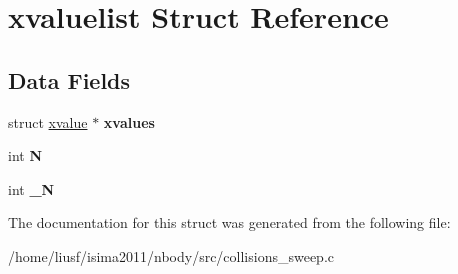 \hypertarget{structxvaluelist}{
\section{xvaluelist Struct Reference}
\label{structxvaluelist}
}
\subsection*{Data Fields}
\begin{DoxyCompactItemize}
\item 
\hypertarget{structxvaluelist_aaeea98f4613b083a3095c46469e808d8}{
struct \hyperlink{structxvalue}{xvalue} $\ast$ {\bfseries xvalues}}
\label{structxvaluelist_aaeea98f4613b083a3095c46469e808d8}

\item 
\hypertarget{structxvaluelist_a55f65c1952ca64b175c3c1287ea8ae4c}{
int {\bfseries N}}
\label{structxvaluelist_a55f65c1952ca64b175c3c1287ea8ae4c}

\item 
\hypertarget{structxvaluelist_a98a4bbe8f114eae2e3a9c7dfcb5a7efc}{
int {\bfseries \_\-N}}
\label{structxvaluelist_a98a4bbe8f114eae2e3a9c7dfcb5a7efc}

\end{DoxyCompactItemize}


The documentation for this struct was generated from the following file:\begin{DoxyCompactItemize}
\item 
/home/liusf/isima2011/nbody/src/collisions\_\-sweep.c\end{DoxyCompactItemize}
